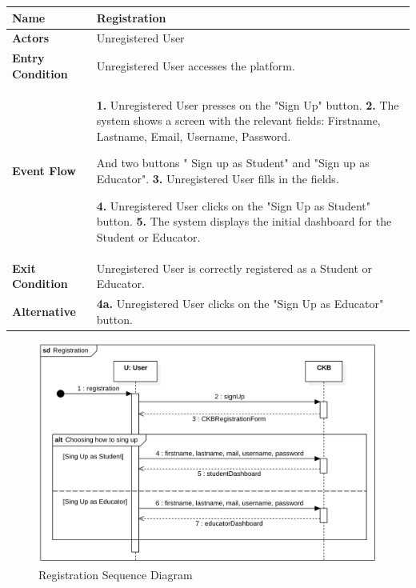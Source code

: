 \begin{table}[h]
\begin{tabular}{|l|p{12cm}|} \hline 

\rule[-3mm]{0mm}{1cm}
\textbf{Name} & Registration \\ \hline 

\rule[-3mm]{0mm}{1cm}
\textbf{Actors} & Unregistered User \\ \hline 

\rule[-3mm]{0mm}{1cm}
\textbf{Entry Condition} & Unregistered User accesses the platform. \\ \hline 

\rule[-3mm]{0mm}{1cm}
\textbf{Event Flow} & 
\textbf{1.} Unregistered User presses on the "Sign Up" button.
\vspace{4pt}
\newline
\textbf{2.} The system shows a screen with the relevant fields:
Firstname,
Lastname,
Email,
Username,
Password.

And two buttons " Sign up as Student" and "Sign up as Educator".
\vspace{2pt}
\newline
\textbf{3.} Unregistered User fills in the fields.

\textbf{4.} Unregistered User clicks on the "Sign Up as Student" button.
\vspace{4pt}
\newline
\textbf{5.} The system displays the initial dashboard for the Student or Educator.

\\ \hline 

\rule[-3mm]{0mm}{1cm}
\textbf{Exit Condition} & Unregistered User is correctly registered as a Student or Educator. \\ \hline
\rule[-3mm]{0mm}{1cm}
\textbf{Alternative} & \textbf{4a.} Unregistered User clicks on the "Sign Up as Educator" button. \\ \hline
\end{tabular}
\end{table}

\begin{figure}[h]
    \centering
    \includegraphics[scale=0.7]{images/SD/RegistrationSD.png}
    \caption{Registration Sequence Diagram}
    \label{fig_SignUpSD}
\end{figure}


